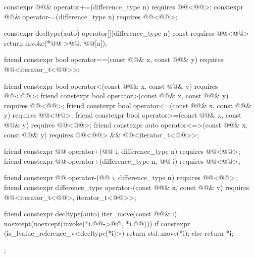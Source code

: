 \begin{codeblock}
{{    constexpr @@& operator+=(difference_type n)
      requires @@<@@>;
    constexpr @@& operator-=(difference_type n)
      requires @@<@@>;

    constexpr decltype(auto) operator[](difference_type n) const
      requires @@<@@> {
      return invoke(*@@->@@, @@[n]);
    }

    friend constexpr bool operator==(const @@& x, const @@& y)
      requires @@<iterator_t<@@>>;

    friend constexpr bool operator<(const @@& x, const @@& y)
      requires @@<@@>;
    friend constexpr bool operator>(const @@& x, const @@& y)
      requires @@<@@>;
    friend constexpr bool operator<=(const @@& x, const @@& y)
      requires @@<@@>;
    friend constexpr bool operator>=(const @@& x, const @@& y)
      requires @@<@@>;
    friend constexpr auto operator<=>(const @@& x, const @@& y)
      requires @@<@@> && @@<iterator_t<@@>>;

    friend constexpr @@ operator+(@@ i, difference_type n)
      requires @@<@@>;
    friend constexpr @@ operator+(difference_type n, @@ i)
      requires @@<@@>;

    friend constexpr @@ operator-(@@ i, difference_type n)
      requires @@<@@>;
    friend constexpr difference_type operator-(const @@& x, const @@& y)
      requires @@<iterator_t<@@>, iterator_t<@@>>;

    friend constexpr decltype(auto) iter_move(const @@& i)
      noexcept(noexcept(invoke(*i.@@->@@, *i.@@))) {
      if constexpr (is_lvalue_reference_v<decltype(*i)>)
        return std::move(*i);
      else
        return *i;
    }
  };
}
\end{codeblock}

